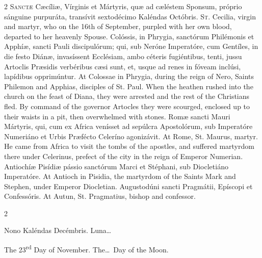 \begin{paracol}{2}
\lettrine[lines=2]{S}{anctæ} Cæcíliæ, 
 Vírginis et Mártyris, quæ ad cæléstem Sponsum, próprio sánguine purpuráta, 
 transívit sextodécimo Kaléndas Octóbris.
\switchcolumn
{}
\lettrine[lines=2]{S}{t.} Cecilia, virgin and martyr, who 
 on the 16th of September, purpled with her own blood, departed to her 
 heavenly Spouse.
\switchcolumn*
{}
Colóssis, in Phrygia, 
 sanctórum Philémonis et Apphíæ, sancti Pauli discipulórum; qui, sub Neróne 
 Imperatóre, cum Gentíles, in die festo Diánæ, invasíssent Ecclésiam, ambo 
 céteris fugiéntibus, tenti, jussu Artoclis Præsidis verbéribus cæsi sunt, 
 et, usque ad renes in fóveam inclúsi, lapídibus opprimúntur.
\switchcolumn
{}
At Colossae in Phrygia, during the 
 reign of Nero, Saints Philemon and Apphias, disciples of St. Paul. 
 When the heathen rushed into the church on the feast of Diana, they were 
 arrested and the rest of the Christians fled. By command of the 
 governor Artocles they were scourged, enclosed up to their waists in a pit, 
 then overwhelmed with stones.
\switchcolumn*
{}
Romæ sancti Mauri 
 Mártyris, qui, cum ex Africa venísset ad sepúlcra Apostolórum, sub 
 Imperatóre Numeriáno et Urbis Præfécto Celeríno agonizávit.
\switchcolumn
{}
At Rome, St. Maurus, martyr. He 
 came from Africa to visit the tombs of the apostles, and suffered martyrdom 
 there under Celerinus, prefect of the city in the reign of Emperor Numerian.
\switchcolumn*
{}
Antiochíæ Pisídiæ 
 pássio sanctórum Marci et Stéphani, sub Diocletiáno Imperatóre.
\switchcolumn
{}
At Antioch in Pisidia, the martyrdom 
 of the Saints Mark and Stephen, under Emperor Diocletian.
\switchcolumn*
{}
Augustodúni sancti 
 Pragmátii, Epíscopi et Confessóris.
\switchcolumn
{}
At Autun, St. Pragmatius, bishop and 
 confessor.
\switchcolumn*
{}
\end{paracol}


\begin{paracol}{2}
\begin{center}{\color{gregoriocolor} Nono Kaléndas Decémbris. 
 Luna\dots\ }\end{center}
\switchcolumn
{}
\begin{center}{\color{gregoriocolor} The 
 23\textsuperscript{rd} Day of 
 November. The\dots\ Day of the Moon.}\end{center}
\end{paracol}

